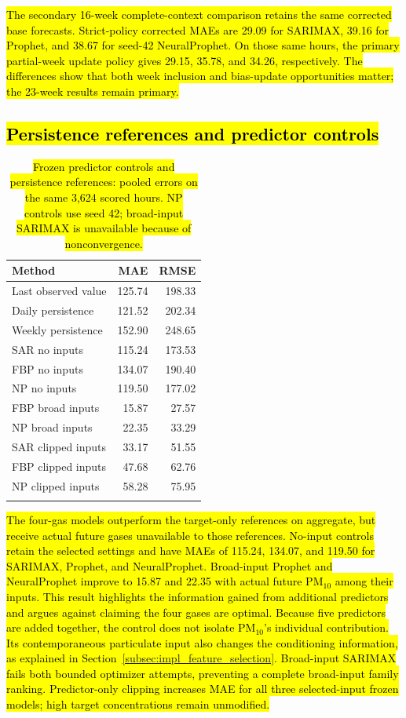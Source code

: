 \documentclass[pdflatex,sn-basic,Numbered]{sn-jnl}
\newcommand{\rev}[1]{\hl{#1}}
\begin{document}
\rev{The secondary 16-week complete-context comparison retains the same corrected base forecasts. Strict-policy corrected MAEs are 29.09 for SARIMAX, 39.16 for Prophet, and 38.67 for seed-42 NeuralProphet. On those same hours, the primary partial-week update policy gives 29.15, 35.78, and 34.26, respectively. The differences show that both week inclusion and bias-update opportunities matter; the 23-week results remain primary.}

\subsection{\texorpdfstring{\rev{Persistence references and predictor controls}}{Persistence references and predictor controls}}

\begin{table}[htbp]
\caption{\rev{Frozen predictor controls and persistence references: pooled errors on the same 3,624 scored hours. NP controls use seed 42; broad-input SARIMAX is unavailable because of nonconvergence.}}
\label{tab:controls}
\begingroup\small\setlength{\tabcolsep}{4pt}
\begin{tabularx}{\linewidth}{@{}Xrr@{}}
\toprule
Method & MAE & RMSE \\
\midrule
Last observed value & 125.74 & 198.33 \\
Daily persistence & 121.52 & 202.34 \\
Weekly persistence & 152.90 & 248.65 \\
SAR no inputs & 115.24 & 173.53 \\
FBP no inputs & 134.07 & 190.40 \\
NP no inputs & 119.50 & 177.02 \\
FBP broad inputs & 15.87 & 27.57 \\
NP broad inputs & 22.35 & 33.29 \\
SAR clipped inputs & 33.17 & 51.55 \\
FBP clipped inputs & 47.68 & 62.76 \\
NP clipped inputs & 58.28 & 75.95 \\
\botrule
\end{tabularx}\endgroup
\end{table}

\rev{The four-gas models outperform the target-only references on aggregate, but receive actual future gases unavailable to those references. No-input controls retain the selected settings and have MAEs of 115.24, 134.07, and 119.50 for SARIMAX, Prophet, and NeuralProphet. Broad-input Prophet and NeuralProphet improve to 15.87 and 22.35 with actual future PM$_{10}$ among their inputs. This result highlights the information gained from additional predictors and argues against claiming the four gases are optimal. Because five predictors are added together, the control does not isolate PM$_{10}$'s individual contribution. Its contemporaneous particulate input also changes the conditioning information, as explained in Section~\ref{subsec:impl_feature_selection}. Broad-input SARIMAX fails both bounded optimizer attempts, preventing a complete broad-input family ranking. Predictor-only clipping increases MAE for all three selected-input frozen models; high target concentrations remain unmodified.}
\end{document}

